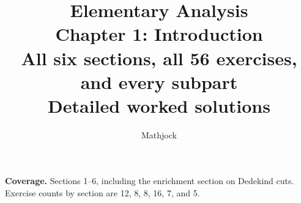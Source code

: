 
\title{\textbf{Elementary Analysis}\\[0.3em]
Chapter 1: Introduction\\[0.4em]
\large All six sections, all 56 exercises, and every subpart\\
Detailed worked solutions}
\author{Mathjock}
\date{}

\maketitle
\bookinfo
\par\textbf{Coverage.} Sections 1--6, including the enrichment section
on Dedekind cuts. Exercise counts by section are 12, 8, 8, 16, 7, and 5.
\tableofcontents
\clearpage

\clearpage

\clearpage

\clearpage

\clearpage

\clearpage



